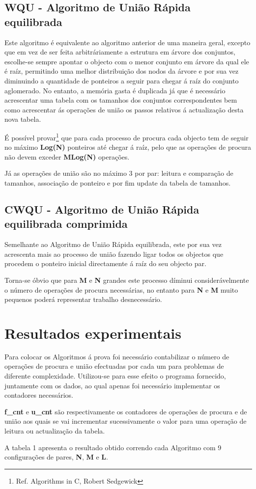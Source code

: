 \documentclass[10pt,a4paper]{article}
\begin{document}
\subsection{WQU - Algoritmo de Uni\~ao Rápida equilibrada}
\par Este algoritmo é equivalente ao algoritmo anterior de uma maneira geral, excepto que em vez de ser feita arbitráriamente a estrutura em árvore dos conjuntos, escolhe-se sempre apontar o objecto com o menor conjunto em árvore da qual ele é raíz, permitindo uma melhor distribuição dos nodos da árvore e por sua vez diminuindo a quantidade de ponteiros a seguir para chegar á raíz do conjunto aglomerado. No entanto, a memória gasta é duplicada já que é necessário acrescentar uma tabela com os tamanhos dos conjuntos correspondentes bem como acrescentar ás operações de união os passos relativos á actualização desta nova tabela.
\par É possível provar\footnote{Ref. Algorithms in C, Robert Sedgewick} que para cada processo de procura cada objecto tem de seguir no máximo \textbf{Log(N)} ponteiros até chegar á raíz, pelo que as operações de procura não devem exceder \textbf{MLog(N)} operações.
\par Já as operações de união são no máximo 3 por par: leitura e comparação de tamanhos, associação de ponteiro e por fim update da tabela de tamanhos.

\subsection{CWQU - Algoritmo de Uni\~ao Rápida equilibrada comprimida}
\par Semelhante ao Algoritmo de Uni\~ao Rápida equilibrada, este por sua vez acrescenta mais ao processo de uni\~ao fazendo ligar todos os objectos que procedem o ponteiro inicial directamente á raíz do seu objecto par.
\par Torna-se óbvio que para \textbf{M} e \textbf{N} grandes este processo díminui considerávelmente o número de operações de procura necessárias, no entanto para \textbf{N} e \textbf{M} muito pequenos poderá representar trabalho desnecessário.



\section{Resultados experimentais}
\par Para colocar os Algoritmos á prova foi necessário contabilizar o número de operações de procura e união efectuadas por cada um para problemas de diferente complexidade. Utilizou-se para esse efeito o programa fornecido, juntamente com os dados, ao qual apenas foi necessário implementar os contadores necessários.
\par \textbf{f\_cnt} e \textbf{u\_cnt} são respectivamente os contadores de operações de procura e de união aos quais se vai incrementar sucessivamente o valor para uma operação de leitura ou actualização da tabela.
\par A tabela 1 apresenta o resultado obtido correndo cada Algoritmo com 9 configurações de pares, \textbf{N}, \textbf{M} e \textbf{L}.
\end{document}
